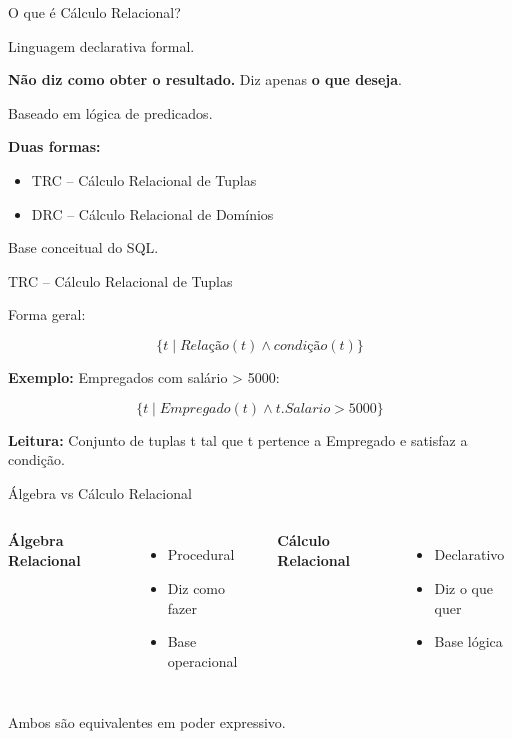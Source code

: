 \documentclass{beamer}
\begin{document}
\begin{frame}{O que é Cálculo Relacional?}

Linguagem declarativa formal.

\textbf{Não diz como obter o resultado.}
Diz apenas \textbf{o que deseja}.

Baseado em lógica de predicados.

\textbf{Duas formas:}
\begin{itemize}
    \item TRC – Cálculo Relacional de Tuplas
    \item DRC – Cálculo Relacional de Domínios
\end{itemize}

Base conceitual do SQL.

\end{frame}





\begin{frame}{TRC – Cálculo Relacional de Tuplas}

Forma geral:

\[
\{ t \mid Relação(t) \land condição(t) \}
\]

\textbf{Exemplo:}
Empregados com salário > 5000:

\[
\{ t \mid Empregado(t) \land t.Salario > 5000 \}
\]

\textbf{Leitura:}
Conjunto de tuplas t
tal que t pertence a Empregado
e satisfaz a condição.

\end{frame}





\begin{frame}{Álgebra vs Cálculo Relacional}

\begin{columns}

\textbf{Álgebra Relacional}
\begin{itemize}
    \item Procedural
    \item Diz como fazer
    \item Base operacional
\end{itemize}

\textbf{Cálculo Relacional}
\begin{itemize}
    \item Declarativo
    \item Diz o que quer
    \item Base lógica
\end{itemize}

\end{columns}

\vspace{0.4cm}

Ambos são equivalentes em poder expressivo.

\end{frame}
\end{document}
